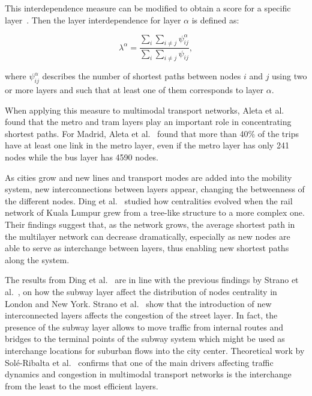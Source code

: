 This interdependence measure can be modified to obtain a score for a specific layer~\cite{Aleta2017Multilayer}. Then the layer interdependence for layer $\alpha$ is defined as:

\begin{equation}\label{eq:layer_interdependency}
    \lambda^{\alpha}=\frac{\sum_i\sum_{i\neq j}\psi_{ij}^{\alpha}}{\sum_i\sum_{i\neq j}\psi_{ij}},
\end{equation}

where $\psi_{ij}^\alpha$ describes the number of shortest paths between nodes $i$ and $j$ using two or more layers and such that at least one of them corresponds to layer $\alpha$.

When applying this measure to multimodal transport networks, Aleta et al.~\cite{Aleta2017Multilayer} found that the metro and tram layers play an important role in concentrating shortest paths. For Madrid, Aleta et al.~\cite{Aleta2017Multilayer} found that more than 40\% of the trips have at least one link in the metro layer, even if the metro layer has only 241 nodes while the bus layer has 4590 nodes. 

As cities grow and new lines and transport modes are added into the mobility system, new interconnections between layers appear, changing the betweenness of the different nodes. Ding et al.~\cite{ding2018traffic} studied how centralities evolved when the rail network of Kuala Lumpur grew from a tree-like structure to a more complex one. Their findings suggest that, as the network grows, the average shortest path in the multilayer network can decrease dramatically, especially as new nodes are able to serve as interchange between layers, thus enabling new shortest paths along the system.

The results from Ding et al.~\cite{ding2018traffic} are in line with the previous findings by Strano et al.~\cite{strano2015features}, on how the subway layer affect the distribution of nodes centrality in London and New York. Strano et al.~\cite{strano2015features} show that the introduction of new interconnected layers affects the congestion of the street layer. In fact, the presence of the subway layer allows to move traffic from internal routes and bridges to the terminal points of the subway system which might be used as interchange locations for suburban flows into the city center. Theoretical work by Sol\'{e}-Ribalta et al.~\cite{sole-ribalta2016congestion} confirms that one of the main drivers affecting traffic dynamics and congestion in multimodal transport networks is the interchange from the least to the most efficient layers.

